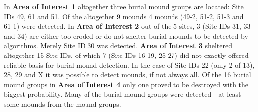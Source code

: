 \documentclass[
  12pt,
]{article}
\begin{document}
In \textbf{Area of Interest 1} altogether three burial mound groups are located: Site IDs 49, 61 and 51. Of the altogether 9 mounds 4 mounds (49-2, 51-2, 51-3 and 61-1) were detected.
In \textbf{Area of Interest 2} out of the 5 sites, 3 (Site IDs 31, 33 and 34) are either too eroded or do not shelter burial mounds to be detected by algorithms. Merely Site ID 30 was detected.
\textbf{Area of Interest 3} sheltered altogether 15 Site IDs, of which 7 (Site IDs 16-19, 25-27) did not exactly offered reliable basis for burial mound detection. In the case of Site IDs 22 (only 2 of 13), 28, 29 and X it was possible to detect mounds, if not always all.
Of the 16 burial mound groups in \textbf{Area of Interest 4} only one proved to be destroyed with the biggest probability. Many of the burial mound groups were detected - at least some mounds from the mound groups.
\end{document}
